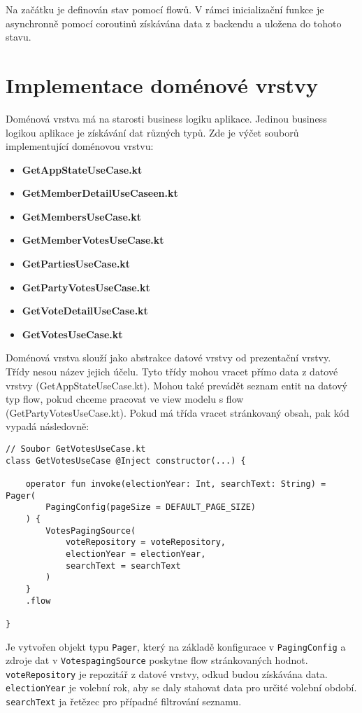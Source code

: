 \noindent Na začátku je definován stav pomocí flowů. V rámci inicializační funkce je asynchronně pomocí coroutinů získávána data z backendu a uložena do tohoto stavu. 

\section {Implementace doménové vrstvy}
Doménová vrstva má na starosti business logiku aplikace. Jedinou business logikou aplikace je získávání dat různých typů. Zde je výčet souborů implementující doménovou vrstvu:

\begin{itemize}
	\item \textbf{GetAppStateUseCase.kt}
	\item \textbf{GetMemberDetailUseCaseen.kt}
	\item \textbf{GetMembersUseCase.kt}
	\item \textbf{GetMemberVotesUseCase.kt}
	\item \textbf{GetPartiesUseCase.kt}
	\item \textbf{GetPartyVotesUseCase.kt}
	\item \textbf{GetVoteDetailUseCase.kt}
	\item \textbf{GetVotesUseCase.kt}
\end{itemize}

\noindent Doménová vrstva slouží jako abstrakce datové vrstvy od prezentační vrstvy. Třídy nesou název jejich účelu. Tyto třídy mohou vracet přímo data z datové vrstvy (GetAppStateUseCase.kt). Mohou také prevádět seznam entit na datový typ flow, pokud chceme pracovat ve view modelu s flow (GetPartyVotesUseCase.kt). Pokud má třída vracet stránkovaný obsah, pak kód vypadá následovně:

\begin{lstlisting}[caption={Ukázka využití třídy doménové vrstvy pro získání stránkovaného seznamu hlasování}, label={lst:use-case-vote}, tabsize=2]
// Soubor GetVotesUseCase.kt
class GetVotesUseCase @Inject constructor(...) {
	
	operator fun invoke(electionYear: Int, searchText: String) = Pager(
		PagingConfig(pageSize = DEFAULT_PAGE_SIZE)
	) {
		VotesPagingSource(
			voteRepository = voteRepository,
			electionYear = electionYear,
			searchText = searchText
		)
	}
	.flow
	
}
\end{lstlisting}

\noindent Je vytvořen objekt typu \lstinline|Pager|, který na základě konfigurace v \lstinline|PagingConfig| a zdroje dat \linebreak v \lstinline|VotespagingSource| poskytne flow stránkovaných hodnot.  \lstinline|voteRepository| je repozitář z datové vrstvy, odkud budou získávána data. \lstinline|electionYear| je volební rok, aby se daly stahovat data pro určité volební období. \lstinline|searchText| ja řetězec pro případné filtrování seznamu.

